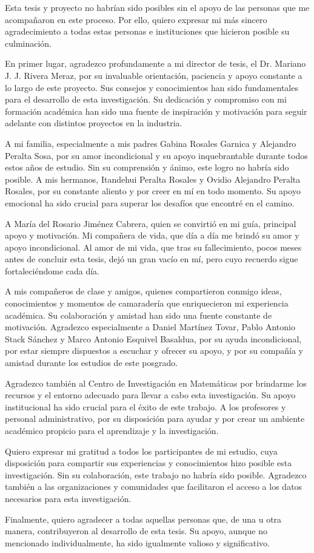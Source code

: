 
Esta tesis y proyecto no habrían sido posibles sin el apoyo de las personas que me acompañaron en
este proceso. Por ello, quiero expresar mi más sincero agradecimiento a todas estas personas e
instituciones que hicieron posible su culminación.

En primer lugar, agradezco profundamente a mi director de tesis, el Dr. Mariano J. J. Rivera Meraz,
por su invaluable orientación, paciencia y apoyo constante a lo largo de este proyecto. Sus consejos
y conocimientos han sido fundamentales para el desarrollo de esta investigación. Su dedicación y
compromiso con mi formación académica han sido una fuente de inspiración y motivación para seguir
adelante con distintos proyectos en la industria.

A mi familia, especialmente a mis padres Gabina Rosales Garnica y Alejandro Peralta Sosa,
por su amor incondicional y su apoyo inquebrantable durante todos estos años de estudio.
Sin su comprensión y ánimo, este logro no habría sido posible. A mis hermanos, Itandehui Peralta
Rosales y Ovidio Alejandro Peralta Rosales, por su constante aliento y por creer en mí en todo
momento. Su apoyo emocional ha sido crucial para superar los desafíos que encontré en el camino.

A María del Rosario Jiménez Cabrera, quien se convirtió en mi guía, principal apoyo y motivación.
Mi compañera de vida, que día a día me brindó su amor y apoyo incondicional. Al amor de mi vida,
que tras su fallecimiento, pocos meses antes de concluir esta tesis, dejó un gran vacío en mí,
pero cuyo recuerdo sigue fortaleciéndome cada día.

A mis compañeros de clase y amigos, quienes compartieron conmigo ideas, conocimientos y momentos
de camaradería que enriquecieron mi experiencia académica. Su colaboración y amistad han sido una
fuente constante de motivación. Agradezco especialmente a Daniel Martínez Tovar, Pablo Antonio
Stack Sánchez y Marco Antonio Esquivel Basaldua, por su ayuda incondicional, por estar siempre
dispuestos a escuchar y ofrecer su apoyo, y por su compañía y amistad durante los estudios de este
posgrado.

Agradezco también al Centro de Investigación en Matemáticas por brindarme los recursos y el entorno
adecuado para llevar a cabo esta investigación. Su apoyo institucional ha sido crucial para el éxito
de este trabajo. A los profesores y personal administrativo, por su disposición para ayudar y por
crear un ambiente académico propicio para el aprendizaje y la investigación.

Quiero expresar mi gratitud a todos los participantes de mi estudio, cuya disposición para compartir
sus experiencias y conocimientos hizo posible esta investigación. Sin su colaboración, este trabajo
no habría sido posible. Agradezco también a las organizaciones y comunidades que facilitaron el
acceso a los datos necesarios para esta investigación.

Finalmente, quiero agradecer a todas aquellas personas que, de una u otra manera, contribuyeron al
desarrollo de esta tesis. Su apoyo, aunque no mencionado individualmente, ha sido igualmente valioso
y significativo.

